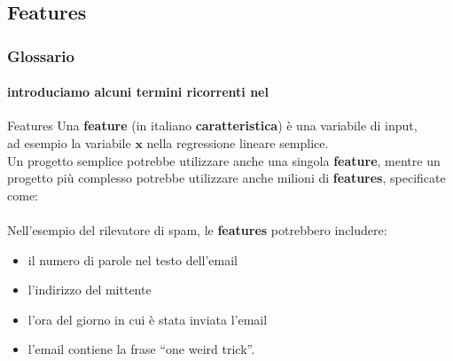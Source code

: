 \subsection[Features]{Features}
\begin{frame}

	\frametitle{Glossario}
	\framesubtitle{introduciamo alcuni termini ricorrenti nel \ml}

	\begin{block}{Features}
		Una \textbf{feature} (in italiano  \textbf{caratteristica}) è una variabile di input,\\
		ad esempio la variabile $\textbf{x}$ nella regressione lineare semplice.\\
		\vspace{1.8mm}
		Un progetto semplice potrebbe utilizzare anche una singola \textbf{feature}, mentre un progetto più complesso potrebbe utilizzare anche milioni di \textbf{features}, specificate come:\\
  			\\
		\vspace{1.8mm}
		\pause
		Nell'esempio del rilevatore di spam, le \textbf{features} potrebbero includere:
		\begin{itemize}
			\pause
			\item il numero di parole nel testo dell'email
			\pause
			\item l'indirizzo del mittente
			\pause
			\item l'ora del giorno in cui è stata inviata l'email
			\pause
			\item l'email contiene la frase ``one weird trick''.
		\end{itemize}

	\end{block}

\end{frame}


